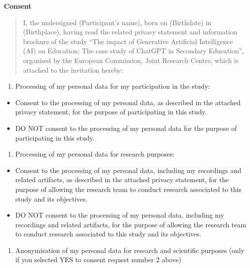 \documentclass[
  11pt,
]{article}
\providecommand{\tightlist}{%
  \setlength{\itemsep}{0pt}\setlength{\parskip}{0pt}}
\begin{document}
\textbf{Consent}

\begin{quote}
I, the undersigned (Participant's name), born on (Birthdate) in (Birthplace), having read the related privacy statement and information brochure of the study ``The impact of Generative Artificial Intelligence (AI) on Education: The case study of ChatGPT in Secondary Education'', organised by the European Commission, Joint Research Centre, which is attached to the invitation hereby:
\end{quote}

\begin{enumerate}
\def\labelenumi{(\arabic{enumi})}
\tightlist
\item
  Processing of my personal data for my participation in the study:
\end{enumerate}

\begin{itemize}
\tightlist
\item[$\square$]
  Consent to the processing of my personal data, as described in the attached privacy statement, for the purpose of participating in this study.
\item[$\square$]
  DO NOT consent to the processing of my personal data for the purpose of participating in this study.
\end{itemize}

\begin{enumerate}
\def\labelenumi{(\arabic{enumi})}
\setcounter{enumi}{1}
\tightlist
\item
  Processing of my personal data for research purposes:
\end{enumerate}

\begin{itemize}
\tightlist
\item[$\square$]
  Consent to the processing of my personal data, including my recordings and related artifacts, as described in the attached privacy statement, for the purpose of allowing the research team to conduct research associated to this study and its objectives.
\item[$\square$]
  DO NOT consent to the processing of my personal data, including my recordings and related artifacts, for the purpose of allowing the research team to conduct research associated to this study and its objectives.
\end{itemize}

\begin{enumerate}
\def\labelenumi{(\arabic{enumi})}
\setcounter{enumi}{2}
\tightlist
\item
  Anonymisation of my personal data for research and scientific purposes (only if you selected YES to consent request number 2 above)
\end{enumerate}
\end{document}

